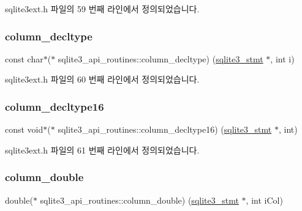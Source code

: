 sqlite3ext.\+h 파일의 59 번째 라인에서 정의되었습니다.

\mbox{\label{structsqlite3__api__routines_ae4e78358b212d7d37aa3a47058614c6f}} 
\subsubsection{\texorpdfstring{column\+\_\+decltype}{column\_decltype}}
{\footnotesize\ttfamily const char$\ast$($\ast$ sqlite3\+\_\+api\+\_\+routines\+::column\+\_\+decltype) (\hyperlink{sqlite3_8h_af2a033da1327cdd77f0a174a09aedd0c}{sqlite3\+\_\+stmt} $\ast$, int i)}



sqlite3ext.\+h 파일의 60 번째 라인에서 정의되었습니다.

\mbox{\label{structsqlite3__api__routines_af5504d756c0ad0526acd0c44f9b2239a}} 
\subsubsection{\texorpdfstring{column\+\_\+decltype16}{column\_decltype16}}
{\footnotesize\ttfamily const void$\ast$($\ast$ sqlite3\+\_\+api\+\_\+routines\+::column\+\_\+decltype16) (\hyperlink{sqlite3_8h_af2a033da1327cdd77f0a174a09aedd0c}{sqlite3\+\_\+stmt} $\ast$, int)}



sqlite3ext.\+h 파일의 61 번째 라인에서 정의되었습니다.

\mbox{\label{structsqlite3__api__routines_a6f10fb7f35cebf6cb62a77adfdc70efc}} 
\subsubsection{\texorpdfstring{column\+\_\+double}{column\_double}}
{\footnotesize\ttfamily double($\ast$ sqlite3\+\_\+api\+\_\+routines\+::column\+\_\+double) (\hyperlink{sqlite3_8h_af2a033da1327cdd77f0a174a09aedd0c}{sqlite3\+\_\+stmt} $\ast$, int i\+Col)}



